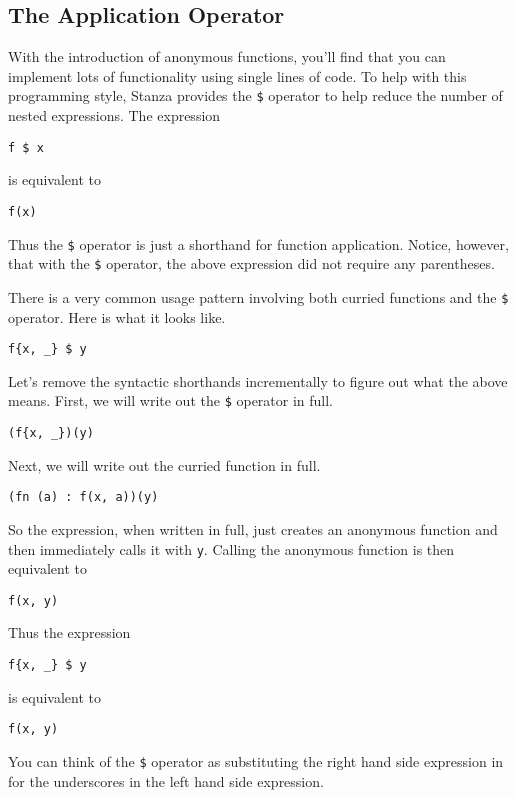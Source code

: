 \documentclass[10pt,oneside]{book}
\begin{document}
\subsection*{The Application Operator}
With the introduction of anonymous functions, you'll find that you can implement lots of functionality using single lines of code. To help with this programming style, Stanza provides the \texttt{\frenchspacing \$} operator to help reduce the number of nested expressions. The expression
\begin{lstlisting}
f $ x
\end{lstlisting}
is equivalent to 
\begin{lstlisting}
f(x)
\end{lstlisting}
Thus the \texttt{\frenchspacing \$} operator is just a shorthand for function application. Notice, however, that with the \texttt{\frenchspacing \$} operator, the above expression did not require any parentheses. 

There is a very common usage pattern involving both curried functions and the \texttt{\frenchspacing \$} operator. Here is what it looks like.
\begin{lstlisting}
f{x, _} $ y
\end{lstlisting}
Let's remove the syntactic shorthands incrementally to figure out what the above means. First, we will write out the \texttt{\frenchspacing \$} operator in full.
\begin{lstlisting}
(f{x, _})(y)
\end{lstlisting}
Next, we will write out the curried function in full.
\begin{lstlisting}
(fn (a) : f(x, a))(y)
\end{lstlisting}
So the expression, when written in full, just creates an anonymous function and then immediately calls it with \texttt{\frenchspacing y}. Calling the anonymous function is then equivalent to
\begin{lstlisting}
f(x, y)
\end{lstlisting}

Thus the expression
\begin{lstlisting}
f{x, _} $ y
\end{lstlisting}
is equivalent to
\begin{lstlisting}
f(x, y)
\end{lstlisting}
You can think of the \texttt{\frenchspacing \$} operator as substituting the right hand side expression in for the underscores in the left hand side expression. 
\end{document}
